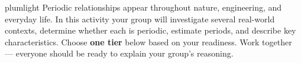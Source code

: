 \documentclass[10pt]{article}
\begin{document}
\namepartnerperiod

\vspace{0.10in}

\begin{scenariobox}{plumlight}
Periodic relationships appear throughout nature, engineering, and everyday
life. In this activity your group will investigate several real-world
contexts, determine whether each is periodic, estimate periods, and describe
key characteristics. Choose \textbf{one tier} below based on your readiness.
Work together --- everyone should be ready to explain your group's reasoning.
\end{scenariobox}

\vspace{0.08in}
\end{document}
